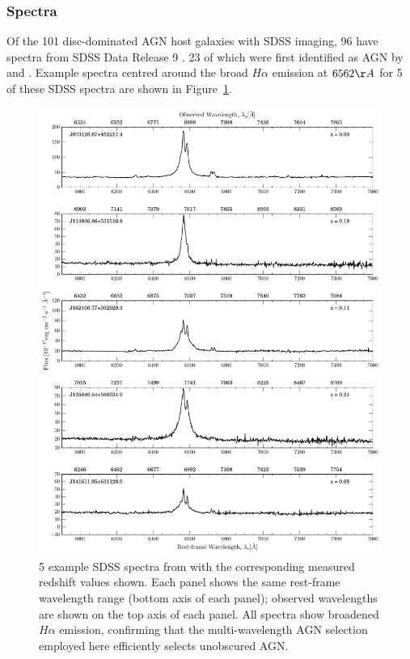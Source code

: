 \subsubsection{Spectra}\label{sec:spectra}

Of the 101 disc-dominated AGN host galaxies with SDSS imaging, 96 have spectra from SDSS Data Release 9 \citep{ahn12}. 23 of which were first identified as AGN by \cite{shen08} and \cite{edelson12}. Example spectra centred around the broad $H\alpha$ emission at $6562\AA$ for 5 of these SDSS spectra are shown in Figure~\ref{fig:SDSSspectra}.

\begin{figure}
\centering
\includegraphics[height=0.8\textheight]{agn/sample_sdss_spectra.pdf}
\caption[Optical SDSS spectra of 5 galaxies in the DISKDOM sample]{5 example SDSS spectra from with the corresponding measured redshift values shown. Each panel shows the same rest-frame wavelength range (bottom axis of each panel); observed wavelengths are shown on the top axis of each panel. All spectra show broadened  $H\alpha$ emission, confirming that the multi-wavelength AGN selection employed here efficiently selects unobscured AGN.}
\label{fig:SDSSspectra}
\end{figure}

